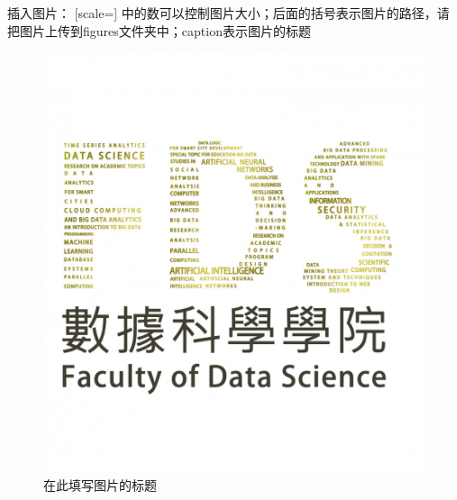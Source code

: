 \documentclass[12pt,hyperref,a4paper,UTF8]{ctexart}
\begin{document}
插入图片：
[scale=] 中的数可以控制图片大小；后面的括号表示图片的路径，请把图片上传到figures文件夹中；caption表示图片的标题
\begin{figure}[h]
    \centering
    \includegraphics[scale=0.1]{figures/FDS logo.jpg}
    \caption{在此填写图片的标题}
\end{figure}
\end{document}

